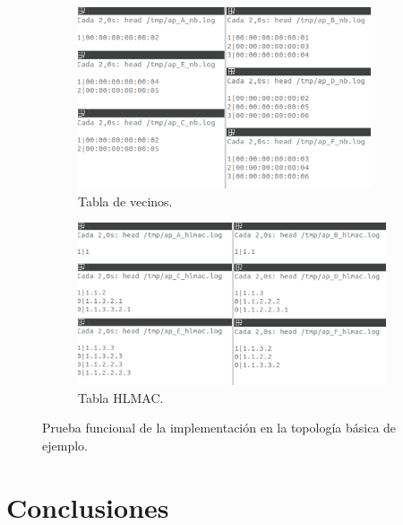 \begin{figure}[ht!]
  \centering
  \begin{subfigure}{.5\textwidth}
    \centering
    \includegraphics[width=0.95\textwidth]{fig/04_in-band/in_band_10.png}
    \caption{Tabla de vecinos.}
    \label{fig:subfiguraA2}
  \end{subfigure}%
  \begin{subfigure}{.5\textwidth}
    \centering
    \includegraphics[width=\textwidth]{fig/04_in-band/in_band_11.png}
    \caption{Tabla HLMAC.}
    \label{fig:subfiguraB2}
  \end{subfigure}
  \caption{Prueba funcional de la implementación en la topología básica de ejemplo.}
  \label{fig:figuraCompleta2}
\end{figure}

\section{Conclusiones}


